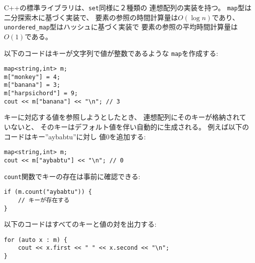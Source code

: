 C++の標準ライブラリは、\texttt{set}同様に２種類の
連想配列の実装を持つ。
\texttt{map}型は二分探索木に基づく実装で、
要素の参照の時間計算量は$O(\log n)$であり、
\texttt{unordered\_map}型はハッシュに基づく実装で
要素の参照の平均時間計算量は$O(1)$である。

以下のコードはキーが文字列で値が整数であるような
\texttt{map}を作成する:

\begin{lstlisting}
map<string,int> m;
m["monkey"] = 4;
m["banana"] = 3;
m["harpsichord"] = 9;
cout << m["banana"] << "\n"; // 3
\end{lstlisting}

\begin{comment}
If the value of a key is requested
but the map does not contain it,
the key is automatically added to the map with
a default value.
For example, in the following code,
the key ''aybabtu'' with value 0
is added to the map.
\end{comment}

キーに対応する値を参照しようとしたとき、
連想配列にそのキーが格納されていないと、
そのキーはデフォルト値を伴い自動的に生成される。
例えば以下のコードはキー''aybabtu''に対し
値0を追加する:

\begin{lstlisting}
map<string,int> m;
cout << m["aybabtu"] << "\n"; // 0
\end{lstlisting}

\begin{comment}
The function \texttt{count} checks
if a key exists in a map:

\begin{lstlisting}
if (m.count("aybabtu")) {
    // key exists
}
\end{lstlisting}
\end{comment}

\texttt{count}関数でキーの存在は事前に確認できる:
\begin{lstlisting}
if (m.count("aybabtu")) {
    // キーが存在する
}
\end{lstlisting}

\begin{comment}
The following code prints all the keys and values
in a map:
\end{comment}

以下のコードはすべてのキーと値の対を出力する:
\begin{lstlisting}
for (auto x : m) {
    cout << x.first << " " << x.second << "\n";
}
\end{lstlisting}

